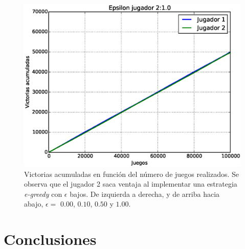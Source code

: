\documentclass[11pt, spanish]{article}
\begin{document}
\begin{figure}
\includegraphics[scale = 0.3]{figuras/Epsilon10.eps}
\caption{Victorias acumuladas en función del número de juegos realizados. Se observa que el jugador 2 saca ventaja al implementar una estrategia \emph{e-greedy} con $\epsilon$ bajos. De izquierda a derecha, y de arriba hacia abajo, $\epsilon = $ $0.00$, $0.10$, $0.50$ y $1.00$.}
\label{fig:e_greedy}
\end{figure}


\section{Conclusiones}
\end{document}
